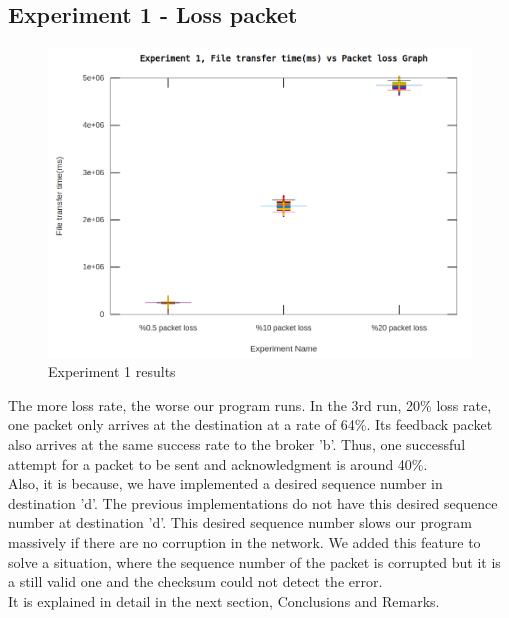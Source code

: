 \documentclass[12pt,journal,compsoc]{IEEEtran}
\begin{document}
\subsection{Experiment 1 - Loss packet}
\begin{figure}[h!]
\centering
\captionsetup{justification=centering}
\includegraphics[width = \linewidth]{exp1.png}
\caption{Experiment 1 results}
\label{fig:exp1}
\end{figure}
The more loss rate, the worse our program runs. In the 3rd run, 20\% loss rate, one packet only arrives at the destination at a rate of 64\%. Its feedback packet also arrives at the same success rate to the broker 'b'. Thus, one successful attempt for a packet to be sent and acknowledgment is around 40\%.\\
Also, it is because, we have implemented a desired sequence number in destination 'd'. The previous implementations do not have this desired sequence number at destination 'd'. This desired sequence number slows our program massively if there are no corruption in the network. We added this feature to solve a situation, where the sequence number of the packet is corrupted but it is a still valid one and the checksum could not detect the error.\\
It is explained in detail in the next section, Conclusions and Remarks.\\
\end{document}
